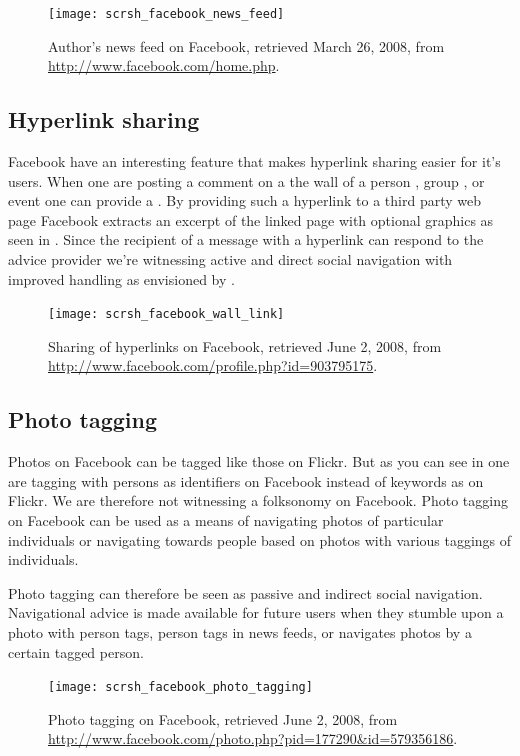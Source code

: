 \begin{figure}
  \texttt{[image: scrsh\_facebook\_news\_feed]}
  \caption[Facebook News Feed]{%
     Author's news feed on Facebook,
     retrieved March 26, 2008, from \url{http://www.facebook.com/home.php}.}
  \label{figure:scrsh.facebook.news.feed}
\end{figure}


\subsection{Hyperlink sharing}

Facebook have an interesting feature that makes hyperlink sharing easier for
it's users. When one are posting a comment on a the wall of a person
,
group
,
or event
one can provide a . By providing such a hyperlink to a
third party web page Facebook extracts an excerpt of the linked page with
optional graphics as seen in . Since the
recipient of a message with a hyperlink can respond to the advice provider
we're witnessing active and direct social navigation with
improved  handling as envisioned by
\citet[]{dieberger97}.

\begin{figure}
  \texttt{[image: scrsh\_facebook\_wall\_link]}
  \caption[Facebook Hyperlink Sharing]{%
     Sharing of hyperlinks on Facebook,
     retrieved June 2, 2008, from
     \url{http://www.facebook.com/profile.php?id=903795175}.}
  \label{figure:scrsh.facebook.wall.link}
\end{figure}

\subsection{Photo tagging}

Photos on Facebook can be tagged  like those on Flickr.
But as you can see in  one are
tagging with persons as identifiers on Facebook instead of keywords as on
Flickr. We are
therefore not witnessing a folksonomy on Facebook. Photo tagging on Facebook
can be used as a means of navigating photos of particular individuals or
navigating towards people based on photos with various taggings of
individuals.

Photo tagging can therefore be seen as passive and indirect social navigation.
Navigational advice is made available for future users when they stumble upon
a photo with person tags, person tags in news feeds, or navigates photos by a
certain tagged person.

\begin{figure}
  \texttt{[image: scrsh\_facebook\_photo\_tagging]}
  \caption[Facebook Photo Tagging]{%
     Photo tagging on Facebook,
     retrieved June 2, 2008, from
     \url{http://www.facebook.com/photo.php?pid=177290&id=579356186}.}
  \label{figure:scrsh.facebook.photo.tagging}
\end{figure}
